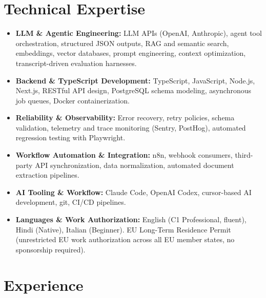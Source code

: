 \documentclass[10pt,a4paper]{article}
\begin{document}
\section{Technical Expertise}
\begin{itemize}
  \item \textbf{LLM \& Agentic Engineering:} LLM APIs (OpenAI, Anthropic), agent tool orchestration, structured JSON outputs, RAG and semantic search, embeddings, vector databases, prompt engineering, context optimization, transcript-driven evaluation harnesses.
  \item \textbf{Backend \& TypeScript Development:} TypeScript, JavaScript, Node.js, Next.js, RESTful API design, PostgreSQL schema modeling, asynchronous job queues, Docker containerization.
  \item \textbf{Reliability \& Observability:} Error recovery, retry policies, schema validation, telemetry and trace monitoring (Sentry, PostHog), automated regression testing with Playwright.
  \item \textbf{Workflow Automation \& Integration:} n8n, webhook consumers, third-party API synchronization, data normalization, automated document extraction pipelines.
  \item \textbf{AI Tooling \& Workflow:} Claude Code, OpenAI Codex, cursor-based AI development, git, CI/CD pipelines.
  \item \textbf{Languages \& Work Authorization:} English (C1 Professional, fluent), Hindi (Native), Italian (Beginner). EU Long-Term Residence Permit (unrestricted EU work authorization across all EU member states, no sponsorship required).
\end{itemize}

\section{Experience}
\end{document}
